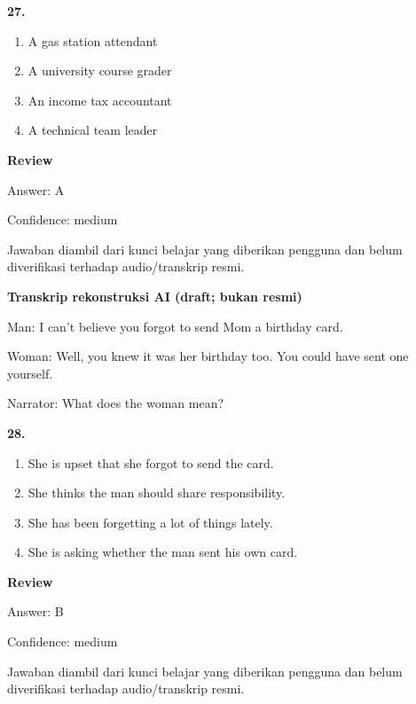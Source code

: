 \documentclass[12pt]{article}
\begin{document}
\noindent\textbf{27.}
\begin{enumerate}[label=(\Alph*),leftmargin=*,itemsep=0.2em]
\item A gas station attendant
\item A university course grader
\item An income tax accountant
\item A technical team leader
\end{enumerate}
\par
\begingroup
\setlength{\parskip}{0pt}
\setlength{\parindent}{0pt}
\textbf{Review}\par
Answer: A\par
Confidence: medium\par
Jawaban diambil dari kunci belajar yang diberikan pengguna dan belum diverifikasi terhadap audio/transkrip resmi.\par
\endgroup
\par
\vspace{0.25\baselineskip}
\begin{exampleblock}
\textbf{Transkrip rekonstruksi AI (draft; bukan resmi)}\par
Man: I can't believe you forgot to send Mom a birthday card.\par
Woman: Well, you knew it was her birthday too. You could have sent one yourself.\par
Narrator: What does the woman mean?\par
\end{exampleblock}
\noindent\textbf{28.}
\begin{enumerate}[label=(\Alph*),leftmargin=*,itemsep=0.2em]
\item She is upset that she forgot to send the card.
\item She thinks the man should share responsibility.
\item She has been forgetting a lot of things lately.
\item She is asking whether the man sent his own card.
\end{enumerate}
\par
\begingroup
\setlength{\parskip}{0pt}
\setlength{\parindent}{0pt}
\textbf{Review}\par
Answer: B\par
Confidence: medium\par
Jawaban diambil dari kunci belajar yang diberikan pengguna dan belum diverifikasi terhadap audio/transkrip resmi.\par
\endgroup
\par
\end{document}
